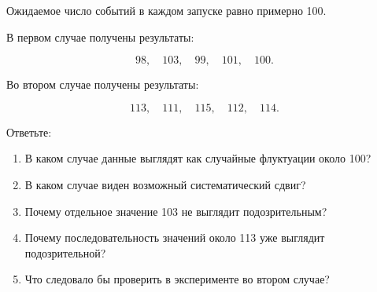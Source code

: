 \documentclass[
  russian,
  11pt,
  a4paper,
  open=any]{scrbook}
\providecommand{\tightlist}{%
  \setlength{\itemsep}{0pt}\setlength{\parskip}{0pt}}
\begin{document}
\begin{semanticpdfbox}[colback=BookCoralSoft,borderline west={1.2mm}{0pt}{BookCoral}]

\par\nopagebreak[4]\vspace{1.2mm}

Ожидаемое число событий в каждом запуске равно примерно 100.

В первом случае получены результаты:

\[
98,\quad 103,\quad 99,\quad 101,\quad 100.
\]

Во втором случае получены результаты:

\[
113,\quad 111,\quad 115,\quad 112,\quad 114.
\]

Ответьте:

\begin{enumerate}
\def\labelenumi{\arabic{enumi}.}
\tightlist
\item
  В каком случае данные выглядят как случайные флуктуации около 100?
\item
  В каком случае виден возможный систематический сдвиг?
\item
  Почему отдельное значение 103 не выглядит подозрительным?
\item
  Почему последовательность значений около 113 уже выглядит
  подозрительной?
\item
  Что следовало бы проверить в эксперименте во втором случае?
\end{enumerate}

\end{semanticpdfbox}
\end{document}
